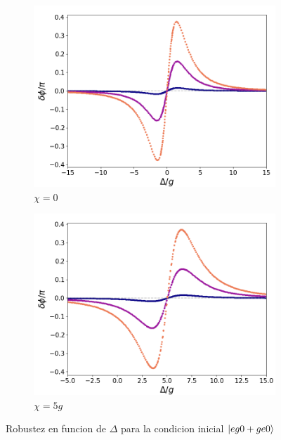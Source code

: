 \begin{figure}[h]
    \centering
    \begin{subfigure}{0.49\textwidth}
        \includegraphics[width=\textwidth]{figuras/ch5/robustez/delta/eg0+ge0 k=0.0g x=0.0g J=0.0g.png}
        \caption{$\chi=0$}
        \label{fig5:robustez detunning 1 eg0}
    \end{subfigure}
    \hfill
    \begin{subfigure}{0.49\textwidth}
        \includegraphics[width=\textwidth]{figuras/ch5/robustez/delta/eg0+ge0 k=0.0g x=5.0g J=0.0g.png}
        \caption{$\chi=5g$}
        \label{fig5:robustez detunning 2 eg0}
    \end{subfigure}
    \vfill

    \caption{Robustez en funcion de $\Delta$ para la condicion inicial $\ket{eg0+ge0}$}
    \label{fig5:robustez detunning eg0}
\end{figure}

